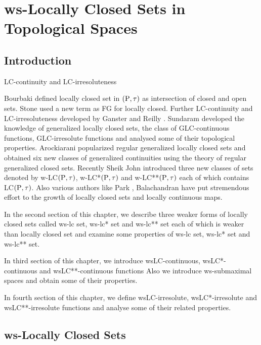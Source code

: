 \chapter{ws-Locally Closed Sets in Topological Spaces}
\graphicspath{{Chapter7/Chapter7Figs/EPS/}{Chapter7/Chapter7Figs/}}

\section{Introduction}\label{sec7.1}

LC-continuity and LC-irresoluteness

Bourbaki \cite{Bourbaki} defined locally closed set in $(\mathrm{P},\tau)$ as intersection of closed and open sets. Stone \cite{Stone} used a new term as FG for locally closed. Further LC-continuity and LC-irresoluteness developed by Ganster and Reilly \cite{Ganster}. Sundaram \cite{Sundaram} developed the knowledge of generalized locally closed sets, the class of GLC-continuous functions, GLC-irresolute functions and analysed some of their topological properties. Arockiarani \cite{Arockiarani} popularized regular generalized locally closed sets and obtained six new classes of generalized continuities using the theory of regular generalized closed sets. Recently Sheik John \cite{Sheik1} introduced three new classes of sets denoted by w-LC$(\mathrm{P}, \tau)$, w-LC{*}$(\mathrm{P}, \tau)$ and w-LC{*}{*}$(\mathrm{P}, \tau)$ each of which contains LC$(\mathrm{P}, \tau)$. Also various authors like Park \cite{Park}, Balachandran \cite{Balachandran} have put stremendous effort to the growth of locally closed sets and locally continuous maps.

In the second section of this chapter, we describe three weaker forms of locally closed sets called ws-lc set, ws-lc* set and ws-lc{*}{*} set each of which is weaker than locally closed set and examine some properties of ws-lc set, ws-lc* set and ws-lc{*}{*} set. 

\newpage

In third section of this chapter, we introduce wsLC-continuous, wsLC*-continuous and wsLC{*}{*}-continuous functions Also we introduce ws-submaximal spaces and obtain some of their properties.

In fourth section of this chapter, we define wsLC-irresolute, wsLC*-irresolute and wsLC**-irresolute functions and analyse some of their related properties.

\section{ws-Locally Closed Sets}\label{sec7.2}

